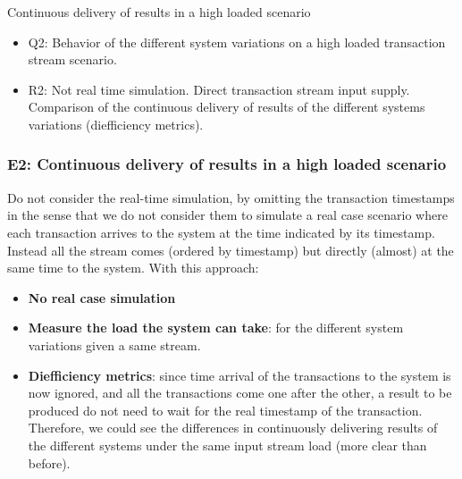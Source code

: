 \documentclass[12pt,a4paper]{article}
\begin{document}
Continuous delivery of results in a high loaded scenario

\begin{itemize}
  \item Q2: Behavior of the different system variations on a high loaded transaction stream scenario.
  \item R2: Not real time simulation. Direct transaction stream input supply. Comparison of the continuous delivery of results of the different systems variations (diefficiency metrics).
\end{itemize}

\subsubsection{E2: Continuous delivery of results in a high loaded scenario}

Do not consider the real-time simulation, by omitting the transaction timestamps in the sense that we do not consider them to simulate a real case scenario where each transaction arrives to the system at the time indicated by its timestamp. 
Instead all the stream comes (ordered by timestamp) but directly (almost) at the same time to the system. With this approach:
\begin{itemize}
  \item \textbf{No real case simulation}
  \item \textbf{Measure the load the system can take}: for the different system variations given a same stream.
  \item \textbf{Diefficiency metrics}: since time arrival of the transactions to the system is now ignored, and all the transactions come one after the other, a result to be produced do not need to wait for the real timestamp of the transaction. Therefore, we could see the differences in continuously delivering results of the different systems under the same input stream load (more clear than before).
\end{itemize}
\end{document}
